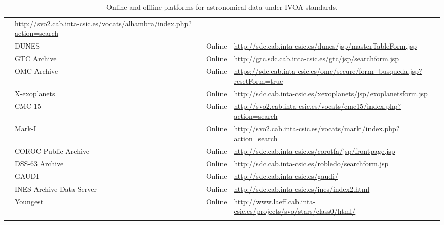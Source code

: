 \begin{center}
\begin{longtable}{|m{2cm}|m{5.5cm}|m{1.5cm}|m{5cm}|}
    & \url{http://svo2.cab.inta-csic.es/vocats/alhambra/index.php?action=search} \\
    \cline{2-4}
    & DUNES & Online
    & \url{http://sdc.cab.inta-csic.es/dunes/jsp/masterTableForm.jsp} \\
    \cline{2-4}
    & GTC Archive & Online
    & \url{http://gtc.sdc.cab.inta-csic.es/gtc/jsp/searchform.jsp} \\
    \cline{2-4}
    & OMC Archive & Online
    & \url{https://sdc.cab.inta-csic.es/omc/secure/form_busqueda.jsp?resetForm=true} \\
    \cline{2-4}
    & X-exoplanets & Online
    & \url{http://sdc.cab.inta-csic.es/xexoplanets/jsp/exoplanetsform.jsp} \\
    \cline{2-4}
    & CMC-15 & Online
    & \url{http://svo2.cab.inta-csic.es/vocats/cmc15/index.php?action=search} \\
    \cline{2-4}
    & Mark-I & Online
    & \url{http://svo2.cab.inta-csic.es/vocats/marki/index.php?action=search} \\
    \cline{2-4}
    & COROC Public Archive & Online
    & \url{http://sdc.cab.inta-csic.es/corotfa/jsp/frontpage.jsp} \\
    \cline{2-4}
    & DSS-63 Archive & Online
    & \url{http://sdc.cab.inta-csic.es/robledo/searchform.jsp} \\
    \cline{2-4}
    & GAUDI & Online
    & \url{http://sdc.cab.inta-csic.es/gaudi/} \\
    \cline{2-4}
    & INES Archive Data Server & Online
    & \url{http://sdc.cab.inta-csic.es/ines/index2.html} \\
    \cline{2-4}
    & Youngest & Online
    & \url{http://www.laeff.cab.inta-csic.es/projects/svo/stars/class0/html/} \\
    \hline
\caption{Online and offline platforms for astronomical data under IVOA
         standards.}
\label{table:vo_platforms}
\end{longtable}
\end{center}
